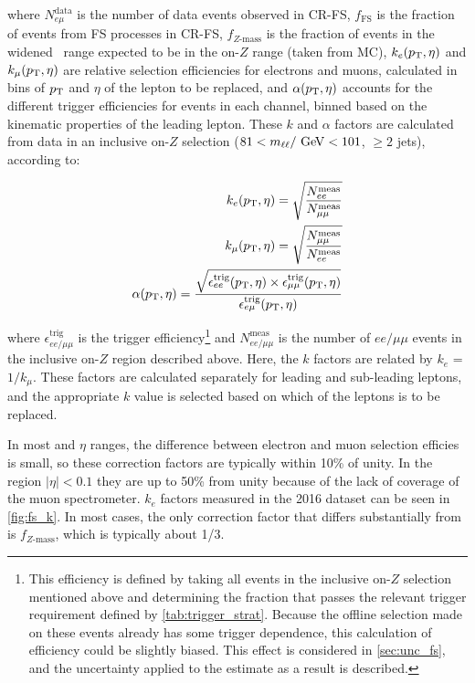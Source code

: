 \noindent where $N_{e\mu}^\text{data}$ is the number of data events observed in CR-FS, 
$f_{\mathrm{FS}}$ is the fraction of events from \ac{FS} processes in CR-FS,  
$f_{Z \mathrm{\text{-}mass}}$ is the fraction of events in the widened \mll~range expected to be in the on-$Z$ range (taken from \ttbar \ac{MC}),
$k_{e}(p_{\text{T}}, \eta)$ and $k_{\mu}(p_{\text{T}}, \eta)$ are relative selection efficiencies for electrons and muons, calculated in bins of $p_{\text{T}}$ and $\eta$ of the lepton to be replaced, 
and $\alpha(p_{\text{T}}, \eta)$ accounts for the different trigger efficiencies for events in each channel, binned based on the kinematic properties of the leading lepton. These $k$ and $\alpha$ factors are calculated from data in an inclusive on-$Z$ selection ($81<\mll/\GeV<101$, $\geq2$ jets), 
according to:

\begin{eqnarray}\label{eq:kfac}
k_{e}(p_{\text{T}}, \eta) = \sqrt{\frac{N_{ee}^{\text{meas}}}{N_{\mu\mu}^{\text{meas}}}} \\
k_{\mu}(p_{\text{T}}, \eta) = \sqrt{\frac{N_{\mu\mu}^{\text{meas}}}{N_{ee}^{\text{meas}}}} \\
\alpha(p_{\text{T}}, \eta) = \frac{\sqrt{\epsilon^\text{trig}_{ee}(p_{\text{T}},\eta)\times\epsilon^\text{trig}_{\mu\mu}(p_{\text{T}},\eta)}}{\epsilon^\text{trig}_{e\mu}(p_{\text{T}},\eta)}
\label{eq:kandalpha}
\end{eqnarray}

\noindent where $\epsilon^\text{trig}_{ee/\mu\mu}$ is the trigger efficiency\footnote{This efficiency is defined by taking all events in the inclusive on-$Z$ selection mentioned above and determining the fraction that passes the relevant trigger requirement defined by \autoref{tab:trigger_strat}. Because the offline selection made on these events already has some trigger dependence, this calculation of efficiency could be slightly biased. This effect is considered in \autoref{sec:unc_fs}, and the uncertainty applied to the estimate as a result is described.} 
and $N_{ee/\mu\mu}^{\text{meas}}$ 
is the number of $ee/\mu\mu$ events in the inclusive on-$Z$ region described above. 
Here, the $k$ factors are related by $k_{e}$ = $1/k_{\mu}$. These factors are calculated separately for leading and sub-leading leptons, and the appropriate $k$ value is selected based on which of the leptons is to be replaced. 

In most \pT and $\eta$ ranges, the difference between electron and muon selection efficies is small, so these correction factors are typically within 10\% of unity. In the region $|\eta|<0.1$ they are up to 50\% from unity because of the lack of coverage of the muon spectrometer. $k_e$ factors measured in the 2016 dataset can be seen in \autoref{fig:fs_k}. In most cases, the only correction factor that differs substantially from is $f_{Z \mathrm{\text{-}mass}}$, which is typically about 1/3. 

